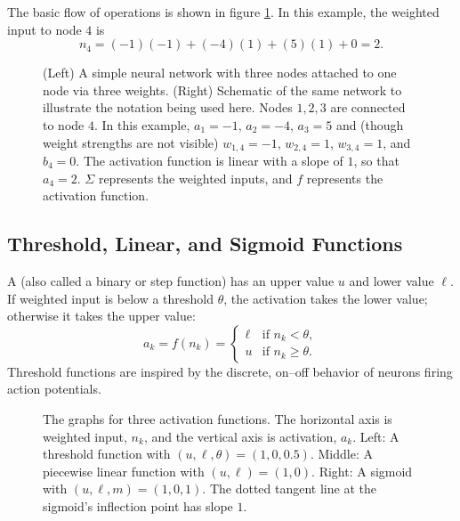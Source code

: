 The basic flow of operations is shown in figure \ref{abridged_simple_network}. In this example, the weighted input to node $4$ is
\[
n_4=(-1)(-1)+(-4)(1)+(5)(1)+0=2.
\]

\begin{figure}[htbp]
\centering
{}
\hspace*{.4in}
\caption[Left: Simbrain screenshot; Right: Jeff Yoshimi.]{(Left) A simple neural network with three nodes attached to one node via three weights. (Right) Schematic of the same network to illustrate the notation being used here. Nodes $1,2,3$ are connected to node $4$. In this example, $a_1=-1$, $a_2=-4$, $a_3=5$ and (though weight strengths are not visible) $w_{1,4}=-1$, $w_{2,4}=1$, $w_{3,4}=1$, and $b_4=0$. The activation function is linear with a slope of $1$, so that $a_4=2$. $\Sigma$ represents the weighted inputs, and $f$ represents the activation function.}
\label{abridged_simple_network}
\end{figure}

\subsection{Threshold, Linear, and Sigmoid Functions}

A  (also called a binary or step function) has an upper value $u$ and lower value $\ell$. If weighted input is below a threshold $\theta$, the activation takes the lower value; otherwise it takes the upper value:
\[
 a_k=f(n_k)=
 \begin{cases}
 \ell & \text{if } n_k<\theta,\\
 u & \text{if } n_k\geq\theta.
 \end{cases}
\]
Threshold functions are inspired by the discrete, on--off behavior of neurons firing action potentials.

\begin{figure}[htbp]
\centering
{}
\caption[Scott Hotton.]{The graphs for three activation functions. The horizontal axis is weighted input, $n_k$, and the vertical axis is activation, $a_k$. Left: A threshold function with $(u,\ell,\theta)=(1,0,0.5)$. Middle: A piecewise linear function with $(u,\ell)=(1,0)$. Right: A sigmoid with $(u,\ell,m)=(1,0,1)$. The dotted tangent line at the sigmoid's inflection point has slope $1$.}
\label{abridged_activation_functions}
\end{figure}

